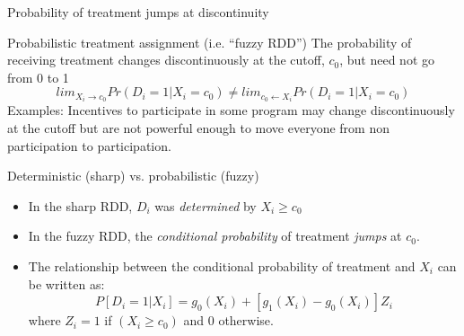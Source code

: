\documentclass{beamer}
\begin{document}
\begin{frame}{Probability of treatment jumps at discontinuity}
	
		\begin{block}{Probabilistic treatment assignment (i.e. ``fuzzy RDD'')}
		The probability of receiving treatment changes discontinuously at the cutoff, $c_0$, but need not go from 0 to 1$$lim_{X_i\rightarrow{c_0}}Pr(D_i=1|X_i=c_0) \neq lim_{c_0 \leftarrow X_i} Pr(D_i=1 | X_i=c_0)$$Examples: Incentives to participate in some program may change discontinuously at the cutoff but are not powerful enough to move everyone from non participation to participation.  
		\end{block}
\end{frame}

\begin{frame}{Deterministic (sharp) vs. probabilistic (fuzzy)}

	\begin{itemize}
		\item In the sharp RDD, $D_i$ was \emph{determined} by $X_i\geq{c_0}$ 
		\item In the fuzzy RDD, the \emph{conditional probability} of treatment \emph{jumps} at $c_0$. 
		\item The relationship between the conditional probability of treatment and $X_i$ can be written as:$$P[D_i=1 | X_i] = g_0(X_i) + [g_1(X_i) - g_0(X_i)]Z_i$$where $Z_i=1$ if $(X_i\geq c_0)$ and $0$ otherwise.
	\end{itemize}

\end{frame}
\end{document}
